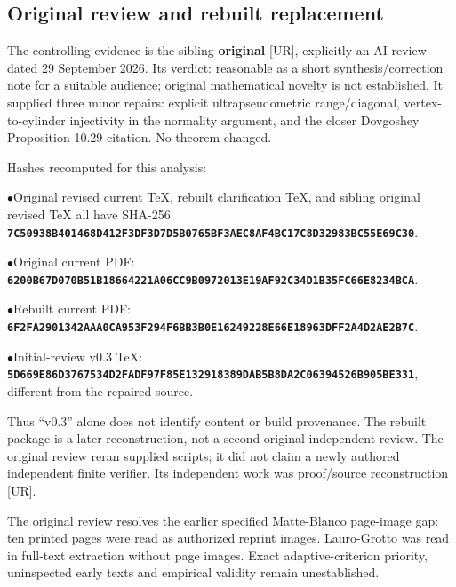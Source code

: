 \documentclass[10pt,letterpaper]{article}
\begin{document}
\subsection*{Original review and rebuilt replacement}

The controlling evidence is the sibling \textbf{original} [UR], explicitly an AI review dated 29 September 2026. Its verdict: reasonable as a short synthesis/correction note for a suitable audience; original mathematical novelty is not established. It supplied three minor repairs: explicit ultrapseudometric range/diagonal, vertex-to-cylinder injectivity in the normality argument, and the closer Dovgoshey Proposition 10.29 citation. No theorem changed.\par

Hashes recomputed for this analysis:\par

\noindent$\bullet$\quad Original revised current TeX, rebuilt clarification TeX, and sibling original revised TeX all have SHA-256 \textbf{\texttt{7C50938B401468D4\allowbreak{}12F3DF3D7D5B0765\allowbreak{}BF3AEC8AF4BC17C8\allowbreak{}D32983BC55E69C30}}.\par
\noindent$\bullet$\quad Original current PDF: \textbf{\texttt{6200B67D070B51B1\allowbreak{}8664221A06CC9B09\allowbreak{}72013E19AF92C34D\allowbreak{}1B35FC66E8234BCA}}.\par
\noindent$\bullet$\quad Rebuilt current PDF: \textbf{\texttt{6F2FA2901342AAA0\allowbreak{}CA953F294F6BB3B0\allowbreak{}E16249228E66E189\allowbreak{}63DFF2A4D2AE2B7C}}.\par
\noindent$\bullet$\quad Initial-review v0.3 TeX: \textbf{\texttt{5D669E86D3767534\allowbreak{}D2FADF97F85E1329\allowbreak{}18389DAB5B8DA2C0\allowbreak{}6394526B905BE331}}, different from the repaired source.\par

Thus ``v0.3'' alone does not identify content or build provenance. The rebuilt package is a later reconstruction, not a second original independent review. The original review reran supplied scripts; it did not claim a newly authored independent finite verifier. Its independent work was proof/source reconstruction [UR].\par

The original review resolves the earlier specified Matte-Blanco page-image gap: ten printed pages were read as authorized reprint images. Lauro-Grotto was read in full-text extraction without page images. Exact adaptive-criterion priority, uninspected early texts and empirical validity remain unestablished.\par
\end{document}
